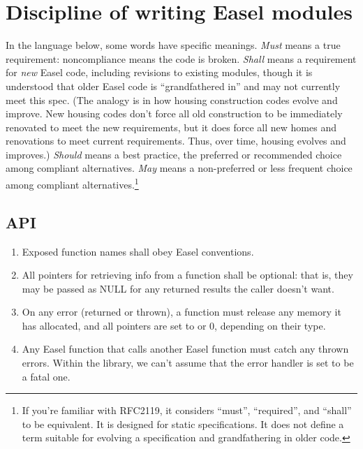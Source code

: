 \section{Discipline of writing Easel modules}

In the language below, some words have specific meanings. \emph{Must}
means a true requirement: noncompliance means the code is
broken. \emph{Shall} means a requirement for \emph{new} Easel code,
including revisions to existing modules, though it is understood that
older Easel code is ``grandfathered in'' and may not currently meet
this spec. (The analogy is in how housing construction codes evolve
and improve. New housing codes don't force all old construction to be
immediately renovated to meet the new requirements, but it does force
all new homes and renovations to meet current requirements. Thus, over
time, housing evolves and improves.)  \emph{Should} means a best
practice, the preferred or recommended choice among compliant
alternatives. \emph{May} means a non-preferred or less frequent choice
among compliant alternatives.\footnote{If you're familiar with
RFC2119, it considers ``must'', ``required'', and ``shall'' to be
equivalent. It is designed for static specifications. It does not
define a term suitable for evolving a specification and grandfathering
in older code.}

\subsection{API}

\begin{enumerate}
\item Exposed function names shall obey Easel conventions.

\item All  pointers for retrieving info from a function
      shall be optional: that is, they may be passed as NULL for
      any returned results the caller doesn't want.
      
\item On any error (returned or thrown), a function must release any
      memory it has allocated, and all  pointers are set
      to  or 0, depending on their type.

\item Any Easel function that calls another Easel function must catch
      any thrown errors. Within the library, we can't assume that the
      error handler is set to be a fatal one.
\end{enumerate}


